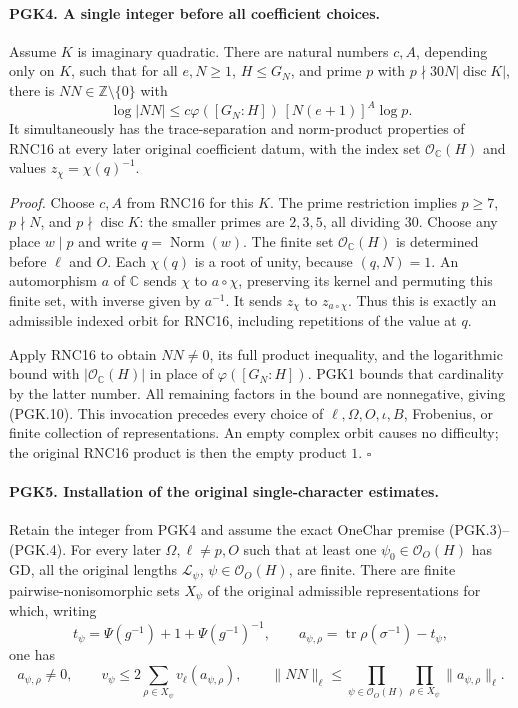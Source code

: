 \documentclass[11pt,a4paper]{article}
\numberwithin{equation}{section}
\theoremstyle{remark}\newtheorem{remark}[theorem]{Remark}
\begin{document}
\paragraph{PGK4. A single integer before all coefficient choices.}
\label{claim:PGK4}
Assume \(K\) is imaginary quadratic. There are natural numbers
\(c,A\), depending only on \(K\), such that for all
\(e,N\ge1\), \(H\le G_N\), and prime \(p\) with
\(p\nmid30N|\operatorname{disc}K|\), there is
\(NN\in\mathbb Z\setminus\{0\}\) with
\[
 \log|NN|\le
       c\varphi([G_N:H])\,[N(e+1)]^A\log p.                    \tag{PGK.10}
\]
It simultaneously has the trace-separation and norm-product
properties of RNC16 at every later original coefficient datum,
with the index set \(\mathcal O_{\mathbb C}(H)\) and values
\(z_\chi=\chi(q)^{-1}\).

\emph{Proof.}
Choose \(c,A\) from RNC16 for this \(K\). The prime restriction
implies \(p\ge7\), \(p\nmid N\), and
\(p\nmid\operatorname{disc}K\): the smaller primes are
\(2,3,5\), all dividing \(30\). Choose any place \(w\mid p\)
and write \(q=\operatorname{Norm}(w)\).
The finite set \(\mathcal O_{\mathbb C}(H)\) is determined
before \(\ell\) and \(O\). Each \(\chi(q)\) is a root of
unity, because \((q,N)=1\). An automorphism \(a\) of
\(\mathbb C\) sends \(\chi\) to \(a\circ\chi\), preserving
its kernel and permuting this finite set, with inverse given
by \(a^{-1}\). It sends \(z_\chi\) to \(z_{a\circ\chi}\).
Thus this is exactly an admissible indexed orbit for RNC16,
including repetitions of the value at \(q\).

Apply RNC16 to obtain \(NN\ne0\), its full product inequality,
and the logarithmic bound with
\(|\mathcal O_{\mathbb C}(H)|\) in place of \(\varphi([G_N:H])\).
PGK1 bounds that cardinality by the latter number. All remaining
factors in the bound are nonnegative, giving (PGK.10).
This invocation precedes every choice of \(\ell,\Omega,O,\iota,B\),
Frobenius, or finite collection of representations. An empty
complex orbit causes no difficulty; the original RNC16 product
is then the empty product \(1\). \hfill\(\square\)

\paragraph{PGK5. Installation of the original single-character estimates.}
\label{claim:PGK5}
Retain the integer from PGK4 and assume the exact
\(\mathrm{OneChar}\) premise (PGK.3)--(PGK.4). For every later
\(\Omega,\ell\ne p,O\) such that at least one
\(\psi_0\in\mathcal O_O(H)\) has \(\mathrm{GD}\), all the
original lengths \(\mathcal L_\psi\),
\(\psi\in\mathcal O_O(H)\), are finite. There are finite
pairwise-nonisomorphic sets \(X_\psi\) of the original admissible
representations for which, writing
\[
 t_\psi=\Psi(g^{-1})+1+\Psi(g^{-1})^{-1},\qquad
 a_{\psi,\rho}=\operatorname{tr}\rho(\sigma^{-1})-t_\psi,
 \tag{PGK.11}
\]
one has
\[
 a_{\psi,\rho}\ne0,\qquad
 v_\psi\le2\sum_{\rho\in X_\psi}v_\ell(a_{\psi,\rho}),\qquad
 \lVert NN\rVert_\ell\le
       \prod_{\psi\in\mathcal O_O(H)}\prod_{\rho\in X_\psi}
                         \lVert a_{\psi,\rho}\rVert_\ell .      \tag{PGK.12}
\]
\end{document}
